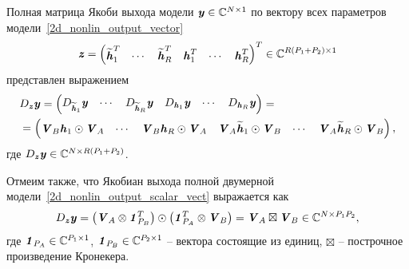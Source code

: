 Полная матрица Якоби выхода модели $\textbf{\textit{y}}\in\mathbb{C}^{N\times1}$ по вектору всех параметров модели~\eqref{2d_nonlin_output_vector}
\begin{equation}
	\textbf{\textit{z}}=
	\begin{pmatrix}
		\widetilde{\textbf{\textit{h}}}_{1}^T & \cdots & \widetilde{\textbf{\textit{h}}}_{R}^T & 
		\textbf{\textit{h}}_{1}^T & \cdots & \textbf{\textit{h}}_{R}^T
	\end{pmatrix}^T\in\mathbb{C}^{R(P_1+P_2)\times1}
\end{equation}
представлен выражением
\begin{align}
	&D_{\textbf{\textit{z}}}\textbf{\textit{y}}=
	\begin{pmatrix}
		D_{\widetilde{\textbf{\textit{h}}}_{1}}\textbf{\textit{y}} & 
		\cdots & 
		D_{\widetilde{\textbf{\textit{h}}}_{R}}\textbf{\textit{y}} &
		D_{\textbf{\textit{h}}_{1}}\textbf{\textit{y}} & 
		\cdots & 
		D_{\textbf{\textit{h}}_{R}}\textbf{\textit{y}}
	\end{pmatrix}= \nonumber \\
	&=
	\begin{pmatrix}
		\textbf{\textit{V}}_B\textbf{\textit{h}}_1\odot\textbf{\textit{V}}_A & 
		\cdots &
		\textbf{\textit{V}}_B\textbf{\textit{h}}_R\odot\textbf{\textit{V}}_A &
		\textbf{\textit{V}}_A\widetilde{\textbf{\textit{h}}}_1\odot\textbf{\textit{V}}_B & 
		\cdots & 
		\textbf{\textit{V}}_A\widetilde{\textbf{\textit{h}}}_R\odot\textbf{\textit{V}}_B
	\end{pmatrix},
	\label{jac_tensor_full}
\end{align}
где $D_{\textbf{\textit{z}}}\textbf{\textit{y}}\in\mathbb{C}^{N\times R(P_1+P_2)}$.

Отмеим также, что Якобиан выхода полной двумерной модели~\eqref{2d_nonlin_output_scalar_vect} выражается как
\begin{equation}
	D_{\textbf{\textit{z}}}\textbf{\textit{y}}
	=
	\left(
	\textbf{\textit{V}}_A \otimes \textbf{\textit{1}}_{P_B}^{T}
	\right)
	\odot
	\left(
	\textbf{\textit{1}}_{P_A}^{T} \otimes \textbf{\textit{V}}_B
	\right)=
	\textbf{\textit{V}}_A\boxtimes\textbf{\textit{V}}_B\in\mathbb{C}^{N\times P_1P_2},
	\label{jac_2d_model_full}
\end{equation}
где $\textbf{\textit{1}}_{P_A}\in\mathbb{C}^{P_1\times1}$, $\textbf{\textit{1}}_{P_B}\in\mathbb{C}^{P_2\times1}$ -- вектора состоящие из единиц, $\boxtimes$ -- построчное произведение Кронекера.




%
